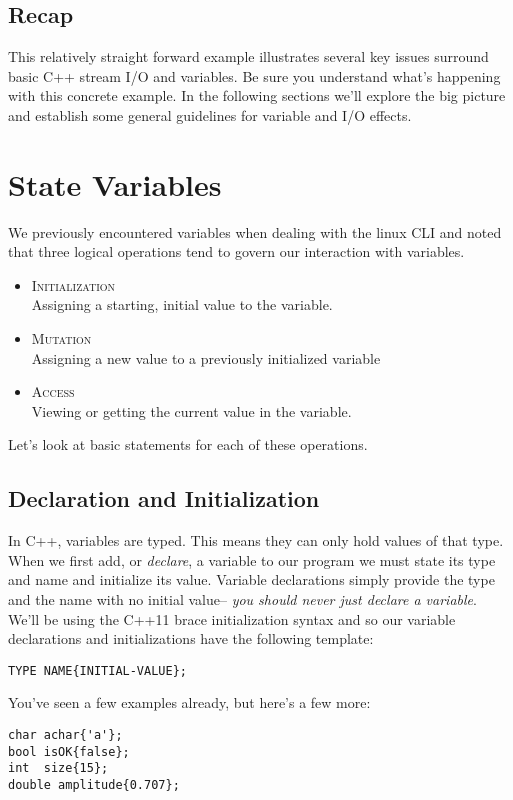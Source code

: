 \documentclass[]{tufte-handout}
\begin{document}
\subsection{Recap}

This relatively straight forward example illustrates several key issues surround basic C++ stream I/O and variables.  Be sure you understand what's happening with this concrete example. In the following sections we'll explore the big picture and establish some general guidelines for variable and I/O effects.

\section{State Variables}

We previously encountered variables when dealing with the linux CLI and noted that three logical operations tend to govern our interaction with variables.
\begin{itemize}
\item \textsc{Initialization} \\
Assigning a starting, initial value to the variable.
\item \textsc{Mutation} \\
Assigning a new value to a previously initialized variable
\item \textsc{Access} \\
Viewing or getting the current value in the variable.
\end{itemize}
Let's look at basic statements for each of these operations.

\subsection{Declaration and Initialization}

In C++, variables are typed. This means they can only hold values of that type. When we first add, or \textit{declare}, a variable to our program we must state its type and name and initialize its value. Variable declarations simply provide the type and the name with no initial value-- \textit{you should never just declare a variable}. We'll be using the C++11 brace initialization syntax and so our variable declarations and initializations have the following template:
\begin{verbatim}
TYPE NAME{INITIAL-VALUE};
\end{verbatim}

You've seen a few examples already, but here's a few more:
\begin{verbatim}
char achar{'a'};
bool isOK{false};
int  size{15};
double amplitude{0.707};
\end{verbatim}
\end{document}
